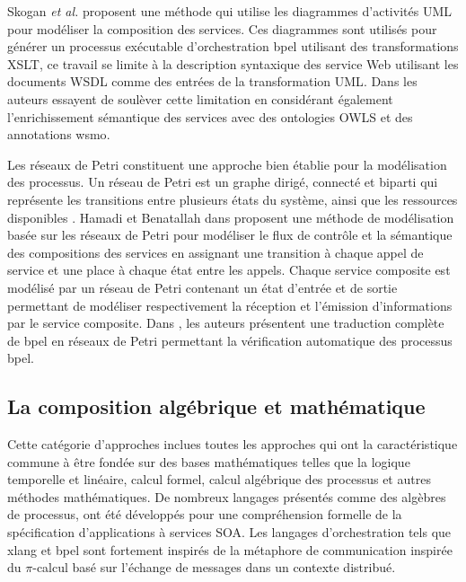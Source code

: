   Skogan \textit{et al.}  \cite{skogan2004web} proposent une méthode
  qui utilise les diagrammes d'activités \textsc{UML} pour modéliser
  la composition des services. Ces diagrammes sont utilisés pour
  générer un processus exécutable d'orchestration \acrshort{bpel}
  utilisant des transformations \textsc{XSLT}, ce travail se limite à
  la description syntaxique des service Web utilisant les documents
  \textsc{WSDL} comme des entrées de la transformation
  \textsc{UML}. Dans \cite{gronmo2005model} les auteurs essayent de
  soulèver cette limitation en considérant également l'enrichissement
  sémantique des services avec des ontologies \textsc{OWLS} et des
  annotations \acrshort{wsmo}.\medskip

  Les réseaux de Petri \cite{petri1962kommunikation} constituent une
  approche bien établie pour la modélisation des processus. Un réseau
  de Petri est un graphe dirigé, connecté et biparti qui représente
  les transitions entre plusieurs états du système, ainsi que les
  ressources disponibles \cite{dumez2010approche}. Hamadi et
  Benatallah dans \cite{hamadi2003petri} proposent une méthode de
  modélisation basée sur les réseaux de Petri pour modéliser le flux
  de contrôle et la sémantique des compositions des services en
  assignant une transition à chaque appel de service et une place à
  chaque état entre les appels. Chaque service composite est modélisé
  par un réseau de Petri contenant un état d'entrée et de sortie
  permettant de modéliser respectivement la réception et l'émission
  d'informations par le service composite. Dans
  \cite{ouyang2007formal}, les auteurs présentent une traduction
  complète de \acrshort{bpel} en réseaux de Petri permettant la
  vérification automatique des processus \acrshort{bpel}.

  \subsection{La composition algébrique et mathématique}
  \label{sec:les-apprc-math}
  Cette catégorie d'approches inclues toutes les approches qui ont la
  caractéristique commune à être fondée sur des bases mathématiques
  telles que la logique temporelle et linéaire, calcul formel, calcul
  algébrique des processus et autres méthodes mathématiques. De
  nombreux langages présentés comme des algèbres de processus, ont
  été développés pour une compréhension formelle de la spécification
  d'applications à services \textsc{SOA}. Les langages d'orchestration
  tels que \acrshort{xlang} et \acrshort{bpel} sont fortement inspirés
  de la métaphore de communication inspirée du $\pi$-calcul basé sur
  l'échange de messages dans un contexte distribué.\medskip

